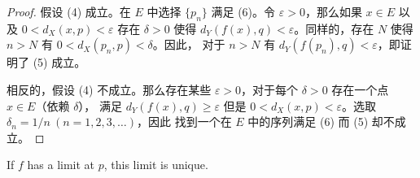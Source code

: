 \documentclass[../poma-notes.tex]{subfiles}
\begin{document}
\begin{proof}
  假设 (4) 成立。在 $E$ 中选择 $\{p_n\}$ 满足 (6)。令 $\varepsilon > 0$，那么如果 $x\in E$ 以及 $0<d_X(x,p)<\varepsilon$
  存在 $\delta > 0$ 使得 $d_Y(f(x),q)<\varepsilon$。同样的，存在 $N$ 使得 $n > N$ 有 $0<d_X(p_n,p)<\delta$。因此，
  对于 $n > N$ 有 $d_Y(f(p_n),q) < \varepsilon$，即证明了 (5) 成立。

  相反的，假设 (4) 不成立。那么存在某些 $\varepsilon > 0$，对于每个 $\delta > 0$ 存在一个点 $x \in E$（依赖 $\delta$），
  满足 $d_Y(f(x),q)\ge\varepsilon$ 但是 $0<d_X(x,p)<\varepsilon$。选取 $\delta_n = 1/n\ (n=1,2,3,\dots)$，因此
  找到一个在 $E$ 中的序列满足 (6) 而 (5) 却不成立。
\end{proof}

\begin{corollary}
  If $f$ has a limit at $p$, this limit is unique.
\end{corollary}
\end{document}
